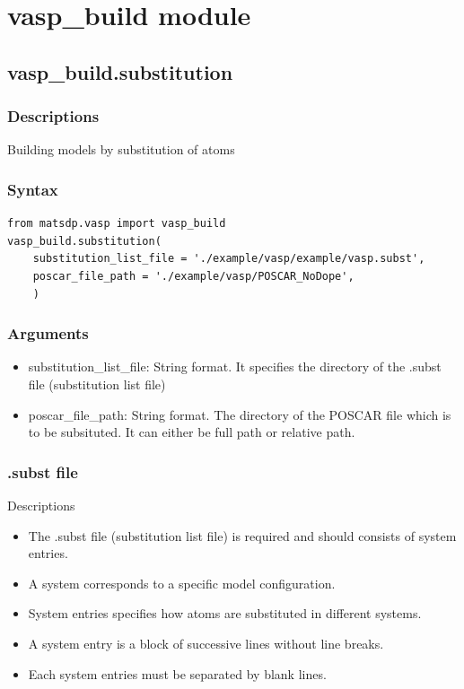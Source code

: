 \documentclass[12pt]{book}
\begin{document}
\section{vasp\_build module}
\subsection{vasp\_build.substitution}
\subsubsection{Descriptions}
Building models by substitution of atoms
\subsubsection{Syntax}
\begin{lstlisting}
from matsdp.vasp import vasp_build
vasp_build.substitution(
    substitution_list_file = './example/vasp/example/vasp.subst',
    poscar_file_path = './example/vasp/POSCAR_NoDope',
    )
\end{lstlisting}
\subsubsection{Arguments}
\begin{itemize}
\item substitution\_list\_file: String format. It specifies the directory of the .subst file (substitution list file)
\item poscar\_file\_path: String format. The directory of the POSCAR file which is to be subsituted. It can either be full path or relative path.
\end{itemize}

\subsubsection{.subst file}

Descriptions
\begin{itemize}
\item The .subst file (substitution list file) is required and should consists of system entries.
\item A system corresponds to a specific model configuration.
\item System entries specifies how atoms are substituted in different systems.
\item A system entry is a block of successive lines without line breaks.
\item Each system entries must be separated by blank lines.
\end{itemize}
\end{document}

